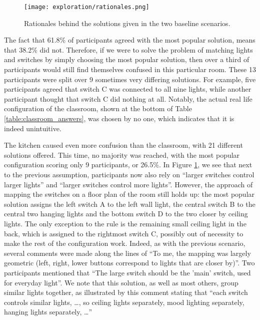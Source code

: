 \begin{figure}
    \centering
    \texttt{[image: exploration/rationales.png]}
    \caption{Rationales behind the solutions given in the two baseline scenarios.}
    \label{fig:explor:rationales}
\end{figure}

The fact that 61.8\% of participants agreed with the most popular solution, means that 38.2\% did not. Therefore, if we were to solve the problem of matching lights and switches by simply choosing the most popular solution, then over a third of participants would still find themselves confused in this particular room. These 13 participants were split over 9 sometimes very differing solutions. For example, five participants agreed that switch C was connected to all nine lights, while another participant thought that switch C did nothing at all. Notably, the actual real life configuration of the classroom, shown at the bottom of Table \ref{table:classroom_answers}, was chosen by no one, which indicates that it is indeed unintuitive.

The kitchen caused even more confusion than the classroom, with 21 different solutions offered. This time, no majority was reached, with the most popular configuration scoring only 9 participants, or 26.5\%. In Figure \ref{fig:explor:rationales}, we see that next to the previous assumption, participants now also rely on ``larger switches control larger lights'' and ``larger switches control more lights''. However, the approach of mapping the switches on a floor plan of the room still holds up: the most popular solution assigns the left switch A to the left wall light, the central switch B to the central two hanging lights and the bottom switch D to the two closer by ceiling lights. The only exception to the rule is the remaining small ceiling light in the back, which is assigned to the rightmost switch C, possibly out of necessity to make the rest of the configuration work. Indeed, as with the previous scenario, several comments were made along the lines of ``To me, the mapping was largely geometric (left, right, lower buttons correspond to lights that are closer by)''. Two participants mentioned that ``The large switch should be the 'main' switch, used for everyday light''. We note that this solution, as well as most others, group similar lights together, as illustrated by this comment stating that ``each switch controls similar lights, \ldots, so ceiling lights separately, mood lighting separately, hanging lights separately, \ldots''

